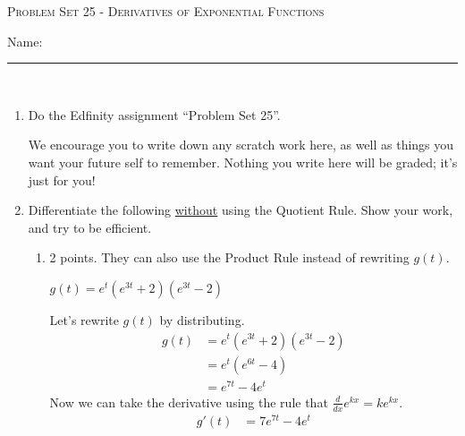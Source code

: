 \documentclass{article}
\newcommand{\doedfinity}[2][\newpage]{
  \begin{problem}[#1]
    Do the Edfinity assignment ``Problem Set #2''.

    We encourage you to write down any scratch work here, as well as
    things you want your future self to remember. Nothing you write
    here will be graded; it's just for you!
  \end{problem}
}
\begin{document}
\begin{center}
  \large\textsc{Problem Set 25 - Derivatives of Exponential Functions}\vspace{.5in}\\
  \begin{problemonly}
   \large Name: \rule{5cm}{0.15mm}\\
   \end{problemonly}
\end{center}

\begin{enumerate}
\item  

  \doedfinity{25}

\item Differentiate the following \uline{without} using the Quotient Rule. Show your work, and try to be efficient.

  \begin{enumerate}

  \item

    \begin{grading}
      2 points. They can also use the Product Rule instead of rewriting $g(t)$. 
    \end{grading}

    \begin{problem}[\vfill]
      $g(t) = e^t \left( e^{3t} + 2 \right) \left( e^{3t} - 2 \right)$
    \end{problem}

    \begin{solution}
      Let's rewrite $g(t)$ by distributing.
      \begin{align*}
        g(t) &= e^t(e^{3t}+2)(e^{3t}-2) \\
        &= e^t(e^{6t}-4) \\
        &= e^{7t} - 4e^t
      \end{align*}
      Now we can take the derivative using the rule that $\frac{d}{dx}e^{kx}= ke^{kx}$.
      \begin{align*}
        g'(t) &= \boxed{7e^{7t}-4e^t} 
      \end{align*}
    \end{solution}


\end{enumerate}
\end{enumerate}
\end{document}
